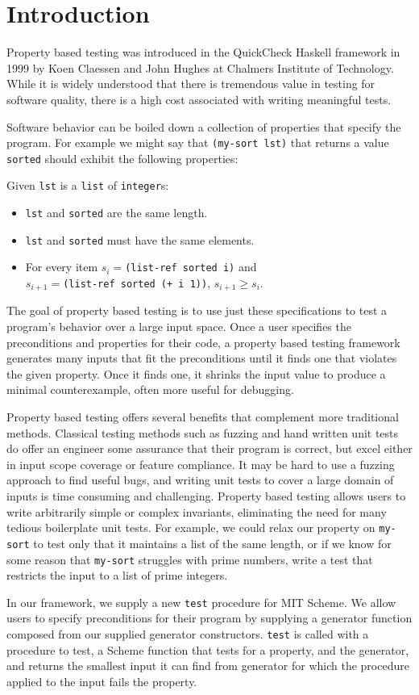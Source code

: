 \section{Introduction}

Property based testing was introduced in the QuickCheck Haskell framework in 1999 by Koen Claessen and John Hughes at Chalmers Institute of Technology. While it is widely understood that there is tremendous value in testing for software quality, there is a high cost associated with writing meaningful tests.

Software behavior can be boiled down a collection of properties that specify the program. For example we might say that \verb|(my-sort lst)| that returns a value \verb|sorted| should exhibit the following properties:

Given \verb|lst| is a \verb|list| of \verb|integer|s:
\begin{itemize}
    \item \verb|lst| and \verb|sorted| are the same length.
    \item \verb|lst| and \verb|sorted| must have the same elements.
    \item For every item $s_i=$\verb|(list-ref sorted i)| and \\$s_{i+1}=$\verb|(list-ref sorted (+ i 1))|, $s_{i+1}\geq s_i$.
\end{itemize}

The goal of property based testing is to use just these specifications to test a program's behavior over a large input space. Once a user specifies the preconditions and properties for their code, a property based testing framework generates many inputs that fit the preconditions until it finds one that violates the given property. Once it finds one, it shrinks the input value to produce a minimal counterexample, often more useful for debugging.

Property based testing offers several benefits that complement more traditional methods. Classical testing methods such as fuzzing and hand written unit tests do offer an engineer some assurance that their program is correct, but excel either in input scope coverage or feature compliance. It may be hard to use a fuzzing approach to find useful bugs, and writing unit tests to cover a large domain of inputs is time consuming and challenging. Property based testing allows users to write arbitrarily simple or complex invariants, eliminating the need for many tedious boilerplate unit tests. For example, we could relax our property on \verb|my-sort| to test only that it maintains a list of the same length, or if we know for some reason that \verb|my-sort| struggles with prime numbers, write a test that restricts the input to a list of prime integers.

In our framework, we supply a new \verb|test| procedure for MIT Scheme. We allow users to specify preconditions for their program by supplying a generator function composed from our supplied generator constructors. \verb|test| is called with a procedure to test, a Scheme function that tests for a property, and the generator, and returns the smallest input it can find from generator for which the procedure applied to the input fails the property.
